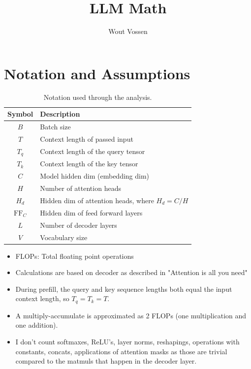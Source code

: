 \documentclass{article}
\title{LLM Math}
\author{Wout Vossen}
\begin{document}
\maketitle

\section{Notation and Assumptions}

\begin{table}[ht]
	\centering
	\begin{tabular}{|c|l|}
		\hline
		Symbol & Description \\
		\hline
		$B$ & Batch size \\
		$T$ & Context length of passed input \\
		$T_q$ & Context length of the query tensor \\
		$T_k$ & Context length of the key tensor \\
		$C$ & Model hidden dim (embedding dim) \\
		$H$ & Number of attention heads \\
		$H_d$ & Hidden dim of attention heads, where $H_d = C/H$\\
		$\mathrm{FF}_C$ & Hidden dim of feed forward layers\\
		$L$ & Number of decoder layers \\
		$V$ & Vocabulary size\\
		\hline
	\end{tabular}
	\caption{Notation used through the analysis.}
	\label{tab:notation}
\end{table}

\begin{itemize}
	\item FLOPs: Total floating point operations
	\item Calculations are based on decoder as described in "Attention is all you need"
	\item During prefill, the query and key sequence lengths both equal the input context length, so $T_q = T_k = T$.
	\item A multiply-accumulate is approximated as 2 FLOPs (one multiplication and one addition).
	\item I don't count softmaxes, ReLU's, layer norms, reshapings, operations with constants, concats, applications of attention masks as those are trivial compared to the matmuls that happen in the decoder layer.
\end{itemize}
\end{document}
